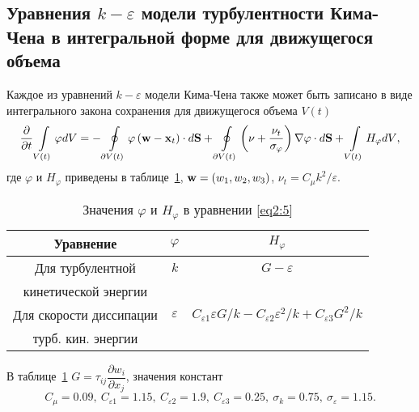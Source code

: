\subsection{Уравнения $k-\varepsilon$ модели турбулентности Кима-Чена в интегральной форме для 
            движущегося объема} 
Каждое из уравнений $k-\varepsilon$ модели Кима-Чена \cite{kimchen} также может быть записано в виде
интегрального закона сохранения для движущегося объема $V(t)$
\begin{equation}
  \label{eq2:5} 
  \frac{\partial }{{\partial t}}\int\limits_{V\left( t \right)} {\varphi dV =  - } 
  \oint\limits_{\partial V\left( t \right)} {\varphi \left( {{\bf{w}} - {\bf{x}}_t } \right) 
  \cdot d{\bf{S}}} + \oint\limits_{\partial V\left( t \right)} {\left( {\nu  + \frac{{\nu _t }}
  {{\sigma _\varphi  }}} \right)\nabla \varphi \cdot d{\bf{S}}}  + \int\limits_{V\left( t \right)} 
  {H_\varphi dV},
\end{equation}
где $\varphi$ и $H_\varphi$ приведены в таблице~\ref{tab2:1}, 
${\bf{w}}=\left( {w_1 ,w_2 ,w_3 } \right)$, $\nu _t = C_\mu k^2/{\varepsilon }$.
\begin{table}[ht!]
  \label{tab2:1}
  \center
  \caption{Значения $\varphi$ и $H_\varphi$ в уравнении \eqref{eq2:5}}
  \begin{tabular}{|c|c|c|}
  \hline
   Уравнение & $\varphi$ & $H_\varphi$ \\
  \hline
  Для турбулентной  & $k$ & $G-\varepsilon$  \\
  кинетической энергии & &
  \\ \hline 
  Для скорости диссипации & $\varepsilon$ & 
  $C_{\varepsilon 1}\varepsilon G/k-C_{\varepsilon 2}\varepsilon^2/k + C_{\varepsilon 3} G^2 /{k}$ \\
  турб. кин. энергии & & \\ \hline 
  \end{tabular}
\end{table}

В таблице~\ref{tab2:1} $G = \tau _{ij} \dfrac{{\partial w_i }}{{\partial x_j }}$, значения констант
\begin{equation*}
C_\mu=0.09,\ C_{\varepsilon 1}=1.15,\ C_{\varepsilon 2}=1.9,\ C_{\varepsilon 3}=0.25,\ {{\sigma _k = 0.75}},
\ {{\sigma _\varepsilon = 1.15}}.
\end{equation*}
